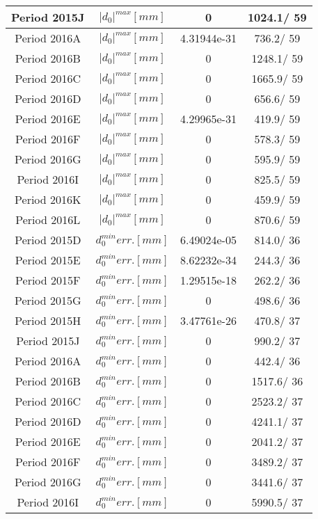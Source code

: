 \documentclass{article}
\begin{document}
\begin{longtable}{c|c|c|c}
\hline
 Period 2015J & $|d_{0}|^{max} [mm]$ & 0 & 1024.1/ 59\\
\hline
 Period 2016A & $|d_{0}|^{max} [mm]$ & 4.31944e-31 & 736.2/ 59\\
\hline
 Period 2016B & $|d_{0}|^{max} [mm]$ & 0 & 1248.1/ 59\\
\hline
 Period 2016C & $|d_{0}|^{max} [mm]$ & 0 & 1665.9/ 59\\
\hline
 Period 2016D & $|d_{0}|^{max} [mm]$ & 0 & 656.6/ 59\\
\hline
 Period 2016E & $|d_{0}|^{max} [mm]$ & 4.29965e-31 & 419.9/ 59\\
\hline
 Period 2016F & $|d_{0}|^{max} [mm]$ & 0 & 578.3/ 59\\
\hline
 Period 2016G & $|d_{0}|^{max} [mm]$ & 0 & 595.9/ 59\\
\hline
 Period 2016I & $|d_{0}|^{max} [mm]$ & 0 & 825.5/ 59\\
\hline
 Period 2016K & $|d_{0}|^{max} [mm]$ & 0 & 459.9/ 59\\
\hline
 Period 2016L & $|d_{0}|^{max} [mm]$ & 0 & 870.6/ 59\\
\hline
 Period 2015D & $d_{0}^{min} err. [mm]$ & 6.49024e-05 & 814.0/ 36\\
\hline
 Period 2015E & $d_{0}^{min} err. [mm]$ & 8.62232e-34 & 244.3/ 36\\
\hline
 Period 2015F & $d_{0}^{min} err. [mm]$ & 1.29515e-18 & 262.2/ 36\\
\hline
 Period 2015G & $d_{0}^{min} err. [mm]$ & 0 & 498.6/ 36\\
\hline
 Period 2015H & $d_{0}^{min} err. [mm]$ & 3.47761e-26 & 470.8/ 37\\
\hline
 Period 2015J & $d_{0}^{min} err. [mm]$ & 0 & 990.2/ 37\\
\hline
 Period 2016A & $d_{0}^{min} err. [mm]$ & 0 & 442.4/ 36\\
\hline
 Period 2016B & $d_{0}^{min} err. [mm]$ & 0 & 1517.6/ 36\\
\hline
 Period 2016C & $d_{0}^{min} err. [mm]$ & 0 & 2523.2/ 37\\
\hline
 Period 2016D & $d_{0}^{min} err. [mm]$ & 0 & 4241.1/ 37\\
\hline
 Period 2016E & $d_{0}^{min} err. [mm]$ & 0 & 2041.2/ 37\\
\hline
 Period 2016F & $d_{0}^{min} err. [mm]$ & 0 & 3489.2/ 37\\
\hline
 Period 2016G & $d_{0}^{min} err. [mm]$ & 0 & 3441.6/ 37\\
\hline
 Period 2016I & $d_{0}^{min} err. [mm]$ & 0 & 5990.5/ 37\\

\end{longtable}
\end{document}
